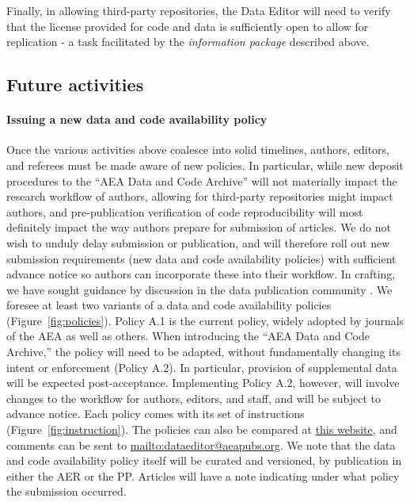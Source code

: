 \documentclass[AEJ]{AEA}
\begin{document}
Finally, in allowing third-party repositories, the Data Editor will need to verify that the license provided for code and data is sufficiently open to allow for replication - a task facilitated by the \textit{information package} described above. 


\subsection{Future activities}

\paragraph{Issuing a new data and code availability policy} Once the various activities above coalesce into solid timelines, authors, editors, and referees must be made aware of new policies. In particular, while new deposit procedures to the ``AEA Data and Code Archive'' will not materially impact the research workflow of authors, allowing for third-party repositories might impact authors, and pre-publication verification of code reproducibility will most definitely impact the way authors prepare for submission of articles. We do not wish to unduly delay submission or publication, and will therefore roll out new submission requirements (new data and code availability policies) with sufficient advance notice so authors can incorporate these into their workflow. In crafting, we have sought guidance by discussion in the data publication community \citep[][e.g.]{HrynaszkiewiczStandardisingHarmonisingResearch2017}. We foresee at least two variants of a data and code availability policies (Figure~\ref{fig:policies}). Policy A.1 is the current policy, widely adopted by journals of the AEA as well as others. When introducing the ``AEA Data and Code Archive,'' the policy will need to be adapted, without fundamentally changing its intent or enforcement (Policy A.2). In particular, provision of supplemental data will be expected post-acceptance. Implementing Policy A.2, however, will involve changes to the workflow for authors, editors, and staff, and will be subject to advance notice. Each policy comes with its set of instructions  (Figure~\ref{fig:instruction}). The policies can also be compared at \href{https://docs.google.com/spreadsheets/d/1khrXxnmKC7Llj9vH17r1KEkN0hcTVqZnQloretcOwDA/edit?usp=sharing}{this website}, and comments can be sent to \url{mailto:dataeditor@aeapubs.org}. We note that the data and code availability policy itself will be curated and versioned, by publication in either the AER or the PP. Articles will have a note indicating under what policy the submission occurred. 
\end{document}
